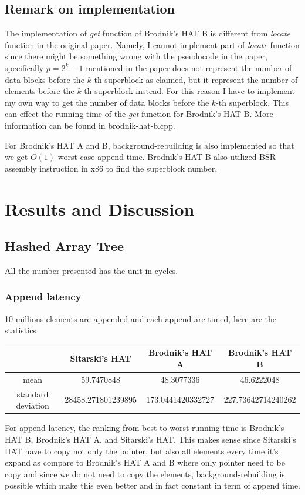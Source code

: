 \documentclass{article} %
\begin{document}
    \subsection*{Remark on implementation}
    The implementation of \emph{get} function of Brodnik's HAT B is different from \emph{locate} function in the original paper.
    Namely, I cannot implement part of \emph{locate} function since there might be something wrong with the pseudocode in the paper,
    specifically \emph{$p=2^k - 1$} mentioned in the paper does not represent the number of data blocks before the $k$-th superblock as claimed,
    but it represent the number of elements before the $k$-th superblock instead. For this reason I have to implement my own way to get the number of
    data blocks before the $k$-th superblock. This can effect the running time of the \emph{get} function for Brodnik's HAT B. More information can be found in brodnik-hat-b.cpp.

    For Brodnik's HAT A and B, background-rebuilding is also implemented so that we get $O(1)$ worst case append time. Brodnik's HAT B also utilized BSR assembly instruction in x86 to find
    the superblock number.

    \section*{Results and Discussion}
    \subsection*{Hashed Array Tree}
    All the number presented has the unit in cycles.
    \subsubsection*{Append latency}
    10 millions elements are appended and each append are timed, here are the statistics
    \begin{center}
        \begin{tabular}{|c|c|c|c|}\hline
            & Sitarski's HAT & Brodnik's HAT A & Brodnik's HAT B\\\hline
            mean &  59.7470848 & 48.3077336 & 46.6222048\\\hline
            standard deviation & 28458.271801239895  & 173.0441420332727 & 227.73642714240262\\\hline 
        \end{tabular}
    \end{center}
    For append latency, the ranking from best to worst running time is Brodnik's HAT B, Brodnik's HAT A, and Sitarski's HAT.
    This makes sense since Sitarski's HAT have to copy not only the pointer, but also all elements every time it's expand as compare to Brodnik's HAT A
    and B where only pointer need to be copy and since we do not need to copy the elements, background-rebuilding is possible which make this even better and in fact constant in term of append time.
    
\end{document}
